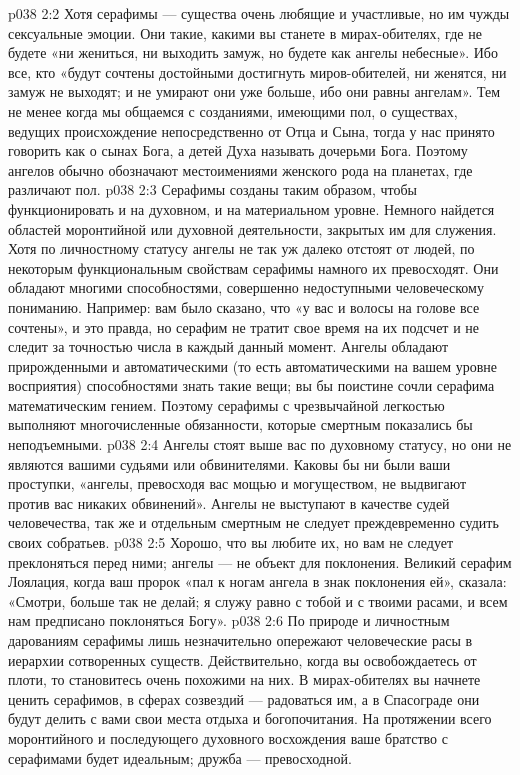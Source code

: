 \vs p038 2:2 \pc Хотя серафимы --- существа очень любящие и участливые, но им чужды сексуальные эмоции. Они такие, какими вы станете в мирах\hyp{}обителях, где не будете «ни жениться, ни выходить замуж, но будете как ангелы небесные». Ибо все, кто «будут сочтены достойными достигнуть миров\hyp{}обителей, ни женятся, ни замуж не выходят; и не умирают они уже больше, ибо они равны ангелам». Тем не менее когда мы общаемся с созданиями, имеющими пол, о существах, ведущих происхождение непосредственно от Отца и Сына, тогда у нас принято говорить как о сынах Бога, а детей Духа называть дочерьми Бога. Поэтому ангелов обычно обозначают местоимениями женского рода на планетах, где различают пол.
\vs p038 2:3 Серафимы созданы таким образом, чтобы функционировать и на духовном, и на материальном уровне. Немного найдется областей моронтийной или духовной деятельности, закрытых им для служения. Хотя по личностному статусу ангелы не так уж далеко отстоят от людей, по некоторым функциональным свойствам серафимы намного их превосходят. Они обладают многими способностями, совершенно недоступными человеческому пониманию. Например: вам было сказано, что «у вас и волосы на голове все сочтены», и это правда, но серафим не тратит свое время на их подсчет и не следит за точностью числа в каждый данный момент. Ангелы обладают прирожденными и автоматическими (то есть автоматическими на вашем уровне восприятия) способностями знать такие вещи; вы бы поистине сочли серафима математическим гением. Поэтому серафимы с чрезвычайной легкостью выполняют многочисленные обязанности, которые смертным показались бы неподъемными.
\vs p038 2:4 \pc Ангелы стоят выше вас по духовному статусу, но они не являются вашими судьями или обвинителями. Каковы бы ни были ваши проступки, «ангелы, превосходя вас мощью и могуществом, не выдвигают против вас никаких обвинений». Ангелы не выступают в качестве судей человечества, так же и отдельным смертным не следует преждевременно судить своих собратьев.
\vs p038 2:5 \pc Хорошо, что вы любите их, но вам не следует преклоняться перед ними; ангелы --- не объект для поклонения. Великий серафим Лоялация, когда ваш пророк «пал к ногам ангела в знак поклонения ей», сказала: «Смотри, больше так не делай; я служу равно с тобой и с твоими расами, и всем нам предписано поклоняться Богу».
\vs p038 2:6 По природе и личностным дарованиям серафимы лишь незначительно опережают человеческие расы в иерархии сотворенных существ. Действительно, когда вы освобождаетесь от плоти, то становитесь очень похожими на них. В мирах\hyp{}обителях вы начнете ценить серафимов, в сферах созвездий --- радоваться им, а в Спасограде они будут делить с вами свои места отдыха и богопочитания. На протяжении всего моронтийного и последующего духовного восхождения ваше братство с серафимами будет идеальным; дружба --- превосходной.
